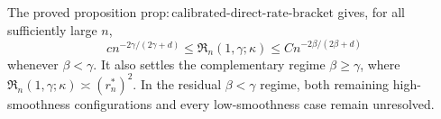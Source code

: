 The proved proposition \(\mathrm{prop:calibrated\text{-}direct\text{-}rate\text{-}bracket}\) gives, for all sufficiently large \(n\), \[c n^{-2\gamma/(2\gamma+d)}\le \mathfrak R_n(1,\gamma;\kappa)\le C n^{-2\beta/(2\beta+d)}\] whenever \(\beta<\gamma\). It also settles the complementary regime \(\beta\ge\gamma\), where \(\mathfrak R_n(1,\gamma;\kappa)\asymp(r_n^*)^2\). In the residual \(\beta<\gamma\) regime, both remaining high-smoothness configurations and every low-smoothness case remain unresolved.
